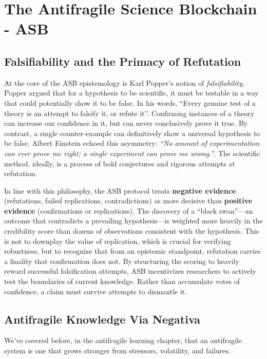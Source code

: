 \documentclass{article}
\begin{document}
\section{The Antifragile Science Blockchain - ASB}


\subsection{Falsifiability and the Primacy of Refutation}
At the core of the ASB epistemology is Karl Popper's notion of \emph{falsifiability}\cite{Popper1963}. Popper argued that for a hypothesis to be scientific, it must be testable in a way that could potentially show it to be false. In his words, ``Every genuine test of a theory is an attempt to falsify it, or refute it''\cite{Popper1963}. Confirming instances of a theory can increase our confidence in it, but can never conclusively prove it true. By contrast, a single counter-example can definitively show a universal hypothesis to be false. Albert Einstein echoed this asymmetry: \emph{``No amount of experimentation can ever prove me right; a single experiment can prove me wrong.''}. The scientific method, ideally, is a process of bold conjectures and rigorous attempts at refutation.

In line with this philosophy, the ASB protocol treats \textbf{negative evidence} (refutations, failed replications, contradictions) as more decisive than \textbf{positive evidence} (confirmations or replications). The discovery of a ``black swan''---an outcome that contradicts a prevailing hypothesis---is weighted more heavily in the credibility score than dozens of observations consistent with the hypothesis. This is not to downplay the value of replication, which is crucial for verifying robustness, but to recognize that from an epistemic standpoint, refutation carries a finality that confirmation does not. By structuring the scoring to heavily reward successful falsification attempts, ASB incentivizes researchers to actively test the boundaries of current knowledge. Rather than accumulate votes of confidence, a claim must survive attempts to dismantle it.


\subsection{Antifragile Knowledge Via Negativa}
We've covered before, in the antifragile learning chapter, that an antifragile system is one that grows stronger from stressors, volatility, and failures. 
\end{document}
